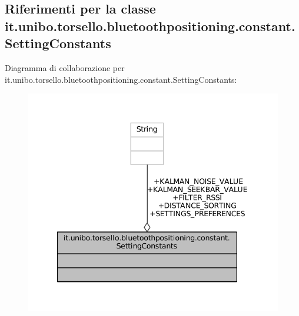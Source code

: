 \hypertarget{classit_1_1unibo_1_1torsello_1_1bluetoothpositioning_1_1constant_1_1SettingConstants}{}\subsection{Riferimenti per la classe it.\+unibo.\+torsello.\+bluetoothpositioning.\+constant.\+Setting\+Constants}
\label{classit_1_1unibo_1_1torsello_1_1bluetoothpositioning_1_1constant_1_1SettingConstants}


Diagramma di collaborazione per it.\+unibo.\+torsello.\+bluetoothpositioning.\+constant.\+Setting\+Constants\+:
\nopagebreak
\begin{figure}[H]
\begin{center}
\leavevmode
\includegraphics[width=341pt]{classit_1_1unibo_1_1torsello_1_1bluetoothpositioning_1_1constant_1_1SettingConstants__coll__graph}
\end{center}
\end{figure}
